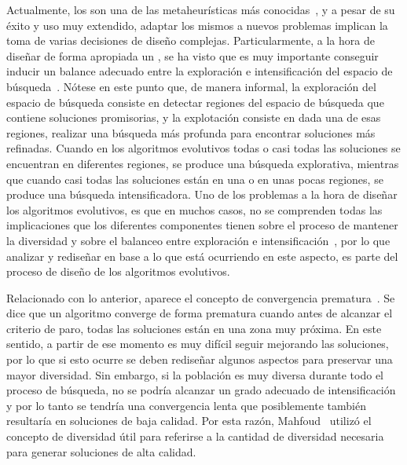 Actualmente, los \EAS{} son una de las metaheurísticas más conocidas~\cite{glover2005handbook}, y a pesar de su éxito y uso muy extendido, adaptar los mismos
a nuevos problemas implican la toma de varias decisiones de diseño complejas.
%
Particularmente, a la hora de diseñar de forma apropiada un \EA{}, se ha visto que es muy importante conseguir
inducir un balance adecuado entre la exploración e intensificación del espacio de búsqueda~\cite{herrera1996adaptation}.
%
Nótese en este punto que, de manera informal, la exploración del espacio de búsqueda consiste en detectar regiones del espacio de búsqueda que contiene soluciones
promisorias, y la explotación consiste en dada una de esas regiones, realizar una búsqueda más profunda para encontrar soluciones más refinadas.
%
Cuando en los algoritmos evolutivos todas o casi todas las soluciones se encuentran en diferentes regiones, se produce una búsqueda explorativa, mientras que cuando 
casi todas las soluciones están en una o en unas pocas regiones, se produce una búsqueda intensificadora.
%
Uno de los problemas a la hora de diseñar los algoritmos evolutivos, es que en muchos casos, no se comprenden todas las implicaciones que los diferentes componentes
tienen sobre el proceso de mantener la diversidad y sobre el balanceo entre exploración e intensificación~\cite{Crepinsek:13}, por lo que analizar y rediseñar en base
a lo que está ocurriendo en este aspecto, es parte del proceso de diseño de los algoritmos evolutivos.

Relacionado con lo anterior, aparece el concepto de convergencia prematura~\cite{Crepinsek:13}.
%
Se dice que un algoritmo converge de forma prematura cuando antes de alcanzar el criterio de paro, todas las soluciones están en una zona muy próxima.
%
En este sentido, a partir de ese momento es muy difícil seguir mejorando las soluciones, por lo que si esto ocurre se deben rediseñar algunos aspectos
para preservar una mayor diversidad.
%
Sin embargo, si la población es muy diversa durante todo el proceso de búsqueda, no se podría alcanzar un grado adecuado de intensificación y por lo tanto 
se tendría una convergencia lenta que posiblemente también resultaría en soluciones de baja calidad.
%
Por esta razón, Mahfoud~\cite{dasgupta2013evolutionary} utilizó el concepto de diversidad útil para referirse a la cantidad de diversidad necesaria para generar 
soluciones de alta calidad.

